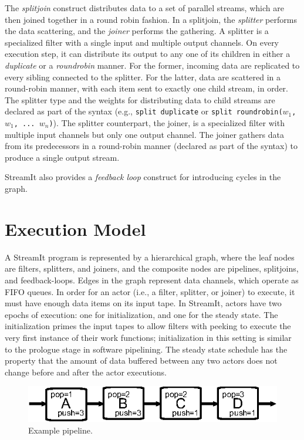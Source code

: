The {\it splitjoin} construct distributes data to a set of parallel
streams, which are then joined together in a round robin fashion.  In
a splitjoin, the {\it splitter} performs the data scattering, and the
{\it joiner} performs the gathering. A splitter is a specialized
filter with a single input and  multiple output channels. On 
every execution step, it can distribute its output to any one of
its children in either a {\it duplicate} or a {\it roundrobin}
manner. For the former, incoming data are replicated to every
sibling connected to the splitter. For the latter, data are scattered
in a round-robin manner, with each item sent to exactly one child
stream, in order.  The splitter type and the weights for distributing data to
child streams are declared as part of the syntax (e.g., \texttt{split
duplicate} or \texttt{split roundrobin($w_1$, $w_1$, ... $w_n$)}). The
splitter counterpart, the joiner, is a specialized filter with  
multiple input channels but only one output channel. The joiner
gathers data from its predecessors in a round-robin manner (declared
as part of the syntax) to produce a single output stream.

StreamIt also provides a {\it feedback loop} construct for introducing
cycles in the graph.

\section{Execution Model}
\label{sec:execmodel}

A StreamIt program is represented by a hierarchical graph,
where the leaf nodes are filters, splitters, and joiners, and
the composite nodes are pipelines, splitjoins, and
feedback-loops. Edges in the graph represent data channels, which 
operate as FIFO queues.
In order for an actor  (i.e., a filter,
splitter, or joiner) to execute, it must have enough data items on its input
tape. In StreamIt, actors have  two epochs
of execution: one for initialization, and one for the steady
state. The initialization primes the input tapes to allow filters with
peeking to execute the very first instance of their work functions;
initialization in this setting is similar to the prologue stage in
software pipelining. The steady state schedule has the property that
the amount of data buffered between any two actors does not change
before and after the actor executions.

\begin{figure}[t]
\begin{center}
\vspace{24pt}
 \includegraphics[scale=1, angle=0]{./pipe-with-rates.eps}
\vspace{-6pt}
 \caption{Example pipeline.}
 \label{fig:pipe-with-rates}
\end{center}
\vspace{-12pt}
\end{figure}


